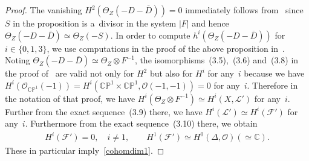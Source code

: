 \documentclass[pdftex]{sigma}
\numberwithin{equation}{section}
\begin{document}
\begin{proof}
The vanishing $H^2( \Theta_Z(-D-\overline D) ) = 0$ immediately follows from~\cite[Proposition~3.1]{HonCMP2} since $S$ in the
proposition is a~divisor in the system $|F|$ and hence $\Theta_Z(-D-\overline D)\simeq\Theta_Z(-S)$.
In order to compute $h^i(\Theta_Z(-D-\overline D) )$ for $i\in \{0,1,3\}$,
we use computations in the proof of the above proposition in~\cite{HonCMP2}.
Noting $\Theta_Z (-D-\overline D ) \simeq \Theta_Z\otimes F^{-1}$, the isomorphisms~(3.5),~(3.6) and~(3.8) in the proof
of~\cite[Proposition~3.1]{HonCMP2} are valid not only for $H^2$ but also for $H^i$ for any~$i$ because we have $H^i(\mathscr
O_{\mathbb{CP}^1} (-1))=H^i({\mathbb{CP}^1\times\mathbb{CP}^1},\mathscr O(-1,-1))=0$ for any~$i$.
Therefore in the notation of that proof, we have $H^i(\Theta_Z\otimes F^{-1}) \simeq H^i(X,\mathscr L')$ for any~$i$.
Further from the exact sequence~(3.9) there, we have $H^i(\mathscr L')\simeq H^i(\mathscr F')$ for any~$i$.
Furthermore from the exact sequence~(3.10) there, we obtain
\begin{gather*}
H^i(\mathscr F') = 0,
\quad
i\neq 1,
\qquad
H^1(\mathscr F')\simeq H^0(\Delta,\mathscr O)  (\simeq\mathbb{C}).
\end{gather*}
These in particular imply~\eqref{cohomdim1}.


\end{proof}
\end{document}
